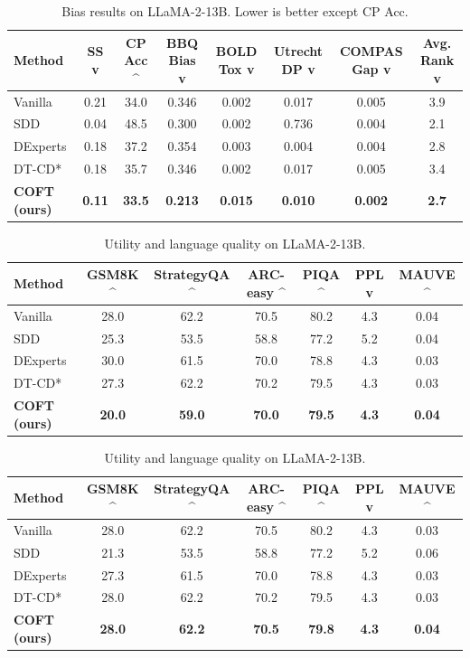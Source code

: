 
\begin{table}[t]
\centering
\caption{Bias results on LLaMA-2-13B. Lower is better except CP Acc.}
\label{tab:bias-llama2-13b}
\begin{tabular}{lccccccc}
\toprule
Method & SS v & CP Acc ^ & BBQ Bias v & BOLD Tox v & Utrecht DP v & COMPAS Gap v & Avg. Rank v \\
\midrule
Vanilla & 0.21 & 34.0 & 0.346 & 0.002 & 0.017 & 0.005 & 3.9 \\
SDD & 0.04 & 48.5 & 0.300 & 0.002 & 0.736 & 0.004 & 2.1 \\
DExperts & 0.18 & 37.2 & 0.354 & 0.003 & 0.004 & 0.004 & 2.8 \\
DT-CD* & 0.18 & 35.7 & 0.346 & 0.002 & 0.017 & 0.005 & 3.4 \\
\textbf{COFT (ours)} & \textbf{0.11} & \textbf{33.5} & \textbf{0.213} & \textbf{0.015} & \textbf{0.010} & \textbf{0.002} & \textbf{2.7} \\
\bottomrule
\end{tabular}
\end{table}

\begin{table}[t]
\centering
\caption{Utility and language quality on LLaMA-2-13B.}
\label{tab:utility-llama2-13b}
\begin{tabular}{lcccccc}
\toprule
Method & GSM8K ^ & StrategyQA ^ & ARC-easy ^ & PIQA ^ & PPL v & MAUVE ^ \\
\midrule
Vanilla & 28.0 & 62.2 & 70.5 & 80.2 & 4.3 & 0.04 \\
SDD & 25.3 & 53.5 & 58.8 & 77.2 & 5.2 & 0.04 \\
DExperts & 30.0 & 61.5 & 70.0 & 78.8 & 4.3 & 0.03 \\
DT-CD* & 27.3 & 62.2 & 70.2 & 79.5 & 4.3 & 0.03 \\
\textbf{COFT (ours)} & \textbf{20.0} & \textbf{59.0} & \textbf{70.0} & \textbf{79.5} & \textbf{4.3} & \textbf{0.04} \\
\bottomrule
\end{tabular}
\end{table}

\begin{table}[t]
\centering
\caption{Utility and language quality on LLaMA-2-13B.}
\label{tab:utility-nospans-llama2-13b}
\begin{tabular}{lcccccc}
\toprule
Method & GSM8K ^ & StrategyQA ^ & ARC-easy ^ & PIQA ^ & PPL v & MAUVE ^ \\
\midrule
Vanilla & 28.0 & 62.2 & 70.5 & 80.2 & 4.3 & 0.03 \\
SDD & 21.3 & 53.5 & 58.8 & 77.2 & 5.2 & 0.06 \\
DExperts & 27.3 & 61.5 & 70.0 & 78.8 & 4.3 & 0.03 \\
DT-CD* & 28.0 & 62.2 & 70.2 & 79.5 & 4.3 & 0.03 \\
\textbf{COFT (ours)} & \textbf{28.0} & \textbf{62.2} & \textbf{70.5} & \textbf{79.8} & \textbf{4.3} & \textbf{0.04} \\
\bottomrule
\end{tabular}
\end{table}

